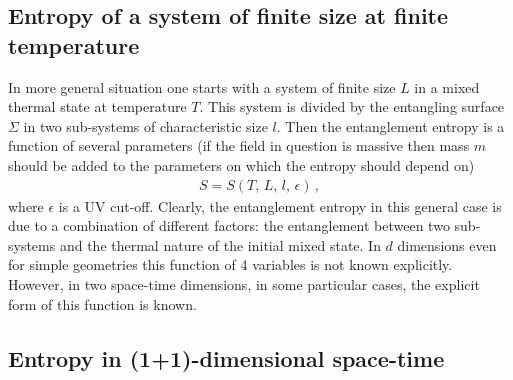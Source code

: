 \documentclass[12pt]{article}
\def\be{\begin{eqnarray}}
\def\ee{\end{eqnarray}}
\def\lb{\label}
\begin{document}
\subsection{Entropy of a system of finite size  at finite temperature}

In more general situation one starts with a system of finite size $L$ in a mixed thermal state at temperature $T$. This system   is divided by the entangling surface $\Sigma$
in two sub-systems of characteristic size $l$. Then the entanglement entropy is a function of several parameters (if the field in question is massive then mass $m$ should be added to the parameters on which the entropy should depend on)
\be
S=S(T,\, L,\, l,\, \epsilon)\, ,
\lb{Sgeneral}
\ee
where $\epsilon$ is a UV cut-off. Clearly, the entanglement entropy in this general case is due to a combination of different factors: the entanglement between two sub-systems and the thermal nature of the initial  mixed state. In $d$ dimensions even for simple geometries this function of 4 variables is not known explicitly.
However, in two space-time dimensions, in some particular cases, the explicit form of this function is known.

\subsection{Entropy in (1+1)-dimensional space-time}
\end{document}
